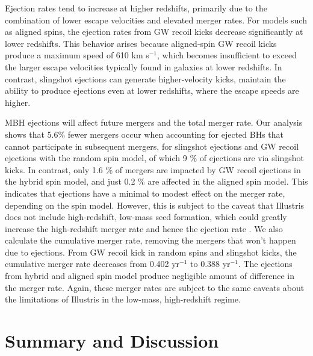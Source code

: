 \documentclass[twocolumn,linenumbers]{aastex701}
\newcommand{\kms}{km s$^{-1}$}
\begin{document}
Ejection rates tend to increase at higher redshifts, primarily due to the combination of lower escape velocities and elevated merger rates. For models such as aligned spins, the ejection rates from GW recoil kicks decrease significantly at lower redshifts. This behavior arises because aligned-spin GW recoil kicks produce a maximum speed of 610 \kms, which becomes insufficient to exceed the larger escape velocities typically found in galaxies at lower redshifts. In contrast, slingshot ejections can generate higher-velocity kicks, maintain the ability to produce ejections even at lower redshifts, where the escape speeds are higher.

MBH ejections will affect future mergers and the total merger rate. Our analysis shows that 5.6\% fewer mergers occur when accounting for ejected BHs that cannot participate in subsequent mergers, for slingshot ejections and GW recoil ejections with the random spin model, of which 9 \% of ejections are via slingshot kicks. In contrast, only 1.6 \% of mergers are impacted by GW recoil ejections in the hybrid spin model, and just 0.2 \% are affected in the aligned spin model. This indicates that ejections have a minimal to modest effect on the merger rate, depending on the spin model. However, this is subject to the caveat that Illustris does not include high-redshift, low-mass seed formation, which could greatly increase the high-redshift merger rate and hence the ejection rate \citep{volonteri_gravitational_2007,Sesana_2007,dunn_role_2020,dongpáez2024,bhowmick2024}. We also calculate the cumulative merger rate, removing the mergers that won't happen due to ejections. From GW recoil kick in random spins and slingshot kicks, the cumulative merger rate decreases from 0.402 yr$^{-1}$ to 0.388 yr$^{-1}$. The ejections from hybrid and aligned spin model produce negligible amount of difference in the merger rate. Again, these merger rates are subject to the same caveats about the limitations of Illustris in the low-mass, high-redshift regime.

\section{Summary and Discussion}

\label{sec: discussion}
\end{document}
